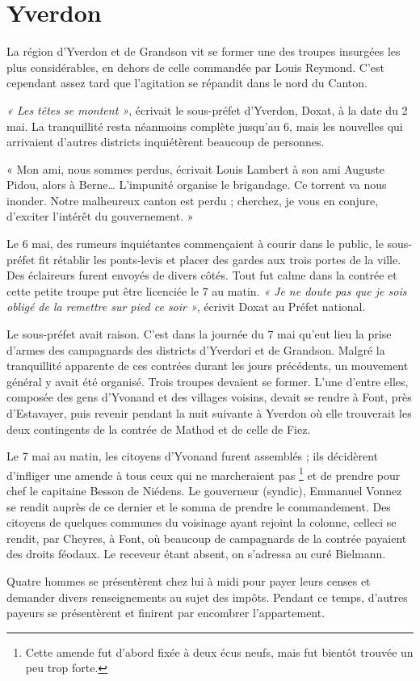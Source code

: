 \documentclass[french,twoside]{book} %
\newenvironment{quoteblock}%
  {\begin{quoting}}
  {\end{quoting}}
\newenvironment{quotebar}{%
    \def\FrameCommand{{\color{rubric!10!}\vrule width 0.5em} \hspace{0.9em}}%
    \def\OuterFrameSep{\itemsep} %
    \MakeFramed {\advance\hsize-\width \FrameRestore}
  }%
  {%
    \endMakeFramed
  }
\renewenvironment{quoteblock}%
  {%
    \savenotes
    \setstretch{0.9}
    \begin{quotebar}
  }
  {%
    \end{quotebar}
    \spewnotes
  }
\begin{document}
\section[Yverdon]{Yverdon}
\noindent La région d’Yverdon et de Grandson vit se former une des troupes insurgées les plus considérables, en dehors de celle commandée par Louis Reymond. C’est cependant assez tard que l’agitation se répandit dans le nord du Canton.\par
\emph{« Les têtes se montent »}, écrivait le sous-préfet d’Yverdon, Doxat, à la date du 2 mai. La tranquillité resta néanmoins complète jusqu’au 6, mais les nouvelles qui arrivaient d’autres districts inquiétèrent beaucoup de personnes.\par

\begin{quoteblock}
 \noindent « Mon ami, nous sommes perdus, écrivait Louis Lambert à son ami Auguste Pidou, alors à Berne… L’impunité organise le brigandage. Ce torrent va nous inonder. Notre malheureux canton est perdu ; cherchez, je vous en conjure, d’exciter l’intérêt du gouvernement. »
 \end{quoteblock}

\noindent Le 6 mai, des rumeurs inquiétantes commençaient à courir dans le public, le sous-préfet fit rétablir les ponts-levis et placer des gardes aux trois portes de la ville. Des éclaireurs furent envoyés de divers côtés. Tout fut calme dans la contrée et cette petite troupe put être licenciée le 7 au matin. \emph{« Je ne doute pas que je sois obligé de la remettre sur pied ce soir »}, écrivit Doxat au Préfet national.\par
Le sous-préfet avait raison. C’est dans la journée du 7 mai qu’eut lieu la prise d’armes des campagnards des districts d’Yverdori et de Grandson. Malgré la tranquillité apparente de ces contrées durant les jours précédents, un mouvement général y avait été organisé. Trois troupes devaient se former. L’une d’entre elles, composée des gens d’Yvonand et des villages voisins, devait se rendre à Font, près d’Estavayer, puis revenir pendant la nuit suivante à Yverdon où elle trouverait les deux contingents de la contrée de Mathod et de celle de Fiez.\par
Le 7 mai au matin, les citoyens d’Yvonand furent assemblés ; ils décidèrent d’infliger une amende à tous ceux qui ne marcheraient pas \footnote{Cette amende fut d’abord fixée à deux écus neufs, mais fut bientôt trouvée un peu trop forte.} et de prendre pour chef le capitaine Besson de Niédens. Le gouverneur (syndic), Emmanuel Vonnez se rendit auprès de ce dernier et le somma de prendre le commandement. Des citoyens de quelques communes du voisinage ayant rejoint la colonne, celleci se rendit, par Cheyres, à Font, où beaucoup de campagnards de la contrée payaient des droits féodaux. Le receveur étant absent, on s’adressa au curé Bielmann.\par
Quatre hommes se présentèrent chez lui à midi pour payer leurs censes et demander divers renseignements au sujet des impôts. Pendant ce temps, d’autres payeurs se présentèrent et finirent par encombrer l’appartement.\par
\end{document}
